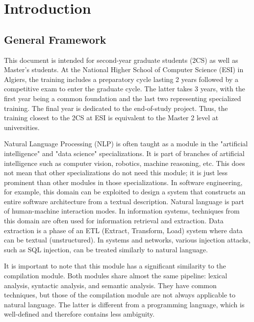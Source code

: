 \documentclass{KodeBook}
\begin{document}
\mainmatter

\fi

\chapter*{Introduction}

\section*{General Framework}

This document is intended for second-year graduate students (2CS) as well as Master's students.
At the National Higher School of Computer Science (ESI) in Algiers, the training includes a preparatory cycle lasting
2 years followed by a competitive exam to enter the graduate cycle.
The latter takes 3 years, with the first year being a common foundation and the last two representing specialized training.
The final year is dedicated to the end-of-study project.
Thus, the training closest to the 2CS at ESI is equivalent to the Master 2 level at universities.

Natural Language Processing (NLP) is often taught as a module in the "artificial intelligence" and "data science" specializations.
It is part of branches of artificial intelligence such as computer vision, robotics, machine reasoning, etc.
This does not mean that other specializations do not need this module; it is just less prominent than other modules in those specializations.
In software engineering, for example, this domain can be exploited to design a system that constructs an entire software architecture from a textual description.
Natural language is part of human-machine interaction modes.
In information systems, techniques from this domain are often used for information retrieval and extraction.
Data extraction is a phase of an ETL (Extract, Transform, Load) system where data can be textual (unstructured).
In systems and networks, various injection attacks, such as SQL injection, can be treated similarly to natural language.

It is important to note that this module has a significant similarity to the compilation module.
Both modules share almost the same pipeline: lexical analysis, syntactic analysis, and semantic analysis.
They have common techniques, but those of the compilation module are not always applicable to natural language.
The latter is different from a programming language, which is well-defined and therefore contains less ambiguity.
\end{document}
